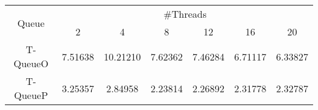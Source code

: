 \begin{tabular}{|c|c|c|c|c|c|c|}
\hline
\multirow{2}{*}{Queue} & \multicolumn{6}{c|}{\#Threads}\\\cline{2-7}& 2 & 4 & 8 & 12 & 16 & 20\\
\hline
\hline
T-QueueO & 7.51638 & 10.21210 & 7.62362 & 7.46284 & 6.71117 & 6.33827\\
T-QueueP & 3.25357 & 2.84958 & 2.23814 & 2.26892 & 2.31778 & 2.32787\\
\hline\end{tabular}
